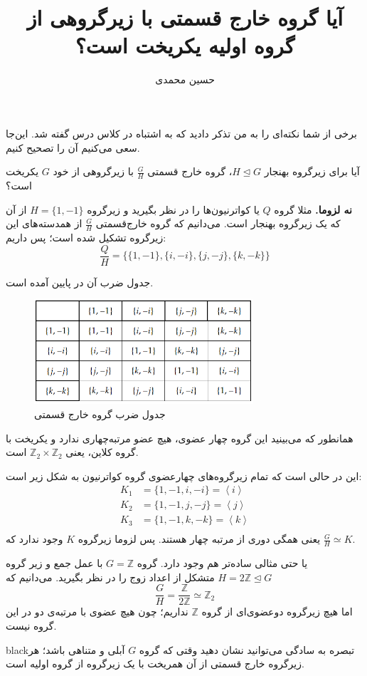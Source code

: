 \documentclass[a4paper, 12pt]{article}
\title{\textbf{
  آیا گروه خارج قسمتی با زیرگروهی از گروه اولیه یکریخت است؟
}}
\author{حسین محمدی
\\}
\begin{document}
\maketitle

\begin{mdframed}
	برخی از شما نکته‌ای را به من تذکر دادید که به اشتباه در کلاس درس گفته شد. این‌جا سعی می‌کنیم آن را تصحیح کنیم.
\end{mdframed}

آیا برای زیرگروه بهنجار
$H \trianglelefteq G$، گروه خارج قسمتی
$\frac{G}{H}$
با زیرگروهی از خود 
$G$ یکریخت است؟

\textbf{نه لزوما.}
 مثلا گروه $Q$ یا کواترنیون‌ها را در نظر بگیرید و زیرگروه 
 $H=\{1,-1\}$
 از آن که یک زیرگروه بهنجار است. می‌دانیم که گروه خارج‌قسمتی $\frac{G}{H}$ از همدسته‌های این زیرگروه تشکیل شده است؛ پس داریم:
 \[
 \frac{Q}{H} = \{
 \{1,-1\} , \{i,-i\} , \{j,-j\},\{k,-k\}
 \}
 \]

جدول ضرب آن در پایین آمده
است.
\begin{figure}
	\centering
	\includegraphics[width=22em]{1.png}
	\caption*{جدول ضرب گروه خارج قسمتی}
	\label{b}
\end{figure}


همانطور که می‌بینید این گروه چهار عضوی، هیچ عضو مرتبه‌چهاری ندارد و یکریخت با گروه کلاین، یعنی 
$\mathbb{Z}_2 \times \mathbb{Z}_2$
است.

این در حالی است که تمام زیرگروه‌های چهارعضوی گروه کواترنیون به شکل زیر است:
\begin{equation*}
	\begin{aligned}
		K_1 &= \{1,-1,i,-i\} = \left< i\right> \\
			K_2 &= \{1,-1,j,-j\} = \left< j\right> \\
				K_3 &= \{1,-1,k,-k\} = \left< k\right> \\
	\end{aligned}
\end{equation*}
یعنی همگی دوری از مرتبه چهار هستند. پس لزوما زیرگروه $K$ وجود ندارد که 
$\frac{G}{H} \simeq K$.

\vspace{3em}
\noindent
یا حتی مثالی ساده‌تر هم وجود دارد. گروه $G = \mathbb{Z} $ با عمل جمع و زیر گروه 
 $H = 2\mathbb{Z} \trianglelefteq G$
 متشکل از اعداد زوج را در نظر بگیرید. می‌دانیم که 
 \[
 \frac{G}{H} = \frac{\mathbb{Z}}{2\mathbb{Z}} \simeq \mathbb{Z}_2
 \]
 اما هیچ زیرگروه دو‌عضوی‌ای از گروه $\mathbb{Z}$ نداریم؛ چون هیچ عضوی با مرتبه‌ی دو در این گروه نیست.
 
 
 \begin{boxes}{black}{تبصره}
 	به سادگی می‌توانید نشان دهید وقتی که گروه $G$ آبلی و متناهی باشد؛ هر زیرگروه خارج قسمتی از آن همریخت با یک زیرگروه از گروه اولیه است.
 \end{boxes}
\end{document}
